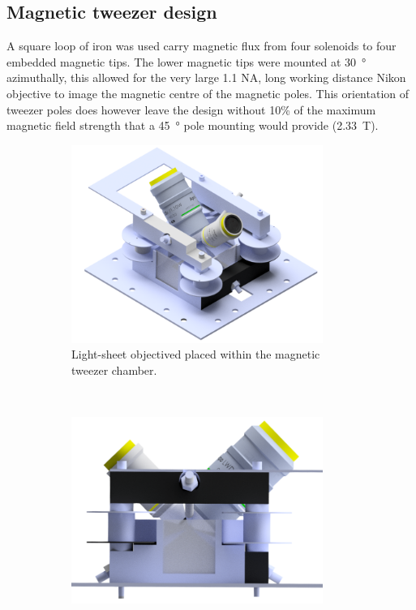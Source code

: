 \subsection{Magnetic tweezer design}

A square loop of iron was used carry magnetic flux from four solenoids to four embedded magnetic tips.
The lower magnetic tips were mounted at \SI{30}{\degree} azimuthally, this allowed for the very large 1.1 NA, long working distance Nikon objective to image the magnetic centre of the magnetic poles.
This orientation of tweezer poles does however leave the design without 10\% of the maximum magnetic field strength that a \SI{45}{\degree} pole mounting would provide (\SI{2.33}{\tesla}).

\begin{figure}[t!]
    \centering
    \begin{subfigure}[t]{0.45\textwidth}
        \centering
        \includegraphics[width=0.9\textwidth]{Chapters/tweezers/Figs/Raster/tweezer_spim_render_shooped}
        \caption{Light-sheet objectived placed within the magnetic tweezer chamber.}
    \end{subfigure}%
    ~
    \begin{subfigure}[t]{0.45\textwidth}
        \centering
        \includegraphics[width=0.9\textwidth]{Chapters/tweezers/Figs/Raster/tweezer_spim_render_side}

\end{subfigure}
\end{figure}
